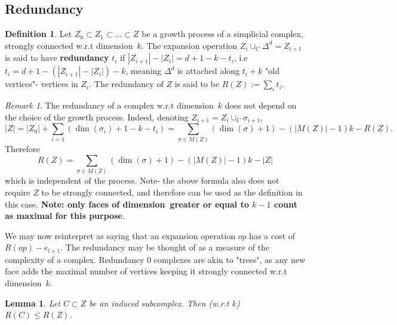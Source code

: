 \documentclass{article}
\newcommand{\prs}[1]{\left( #1 \right)}
\theoremstyle{plain}
\newtheorem{lemma}[theorem]{Lemma}
\theoremstyle{definition}
\newtheorem{definition}[theorem]{Definition}
\theoremstyle{remark}
\newtheorem{remark}[theorem]{Remark}
\newcommand{\di}{dimension}
\begin{document}
\subsection{Redundancy}
\begin{definition}\label{def:redun}
    Let $Z_0\subset Z_1\subset...\subset Z$ be a growth process of a simplicial complex, strongly connected w.r.t \di \ $k$. The expansion operation $Z_i\cup _{C}\Delta^d= Z_{i+1}$ is said to have \textbf{redundancy} $t_i$ if $|Z_{i+1}|-|Z_i|=d+1-k-t_i$, i.e $t_i=d+1-(|Z_{i+1}|-|Z_i|)-k$, meaning $\Delta^d$ is attached along $t_i+k$ "old vertices"- vertices in $Z_i$. 
    The redundancy of $Z$ is said to be $R(Z):=\sum_i t_i$.
\end{definition}
\begin{remark}
    The redundancy of a complex w.r.t \di \ $k$ does not depend on the choice of the growth process. Indeed, denoting $ Z_{i+1}=Z_i\cup _{C}\sigma_{i+1}$, 
    $$|Z|=|Z_0|+\sum_{i=1}\prs{\dim(\sigma_{i})+1-k-t_i}=\sum_{\sigma\in M(Z)}(\dim(\sigma)+1)-(|M(Z)|-1)k-R(Z).$$
    Therefore
    \begin{equation}\label{eqDefRedun}
        R(Z)=\sum_{\sigma\in M(Z)}(\dim(\sigma)+1)-(|M(Z)|-1)k-|Z|
    \end{equation}
    which is independent of the process. Note- the above formula also does not require $Z$ to be strongly connected, and therefore can be used as the definition in this case. \textbf{Note: only faces of \di \ greater or equal to $k-1$ count as maximal for this purpose}. \par
    We may now reinterpret  as saying that an expansion operation $op$ has a cost of $R(op)-e_{l+1}$.
    The redundancy may be thought of as a measure of the complexity of a complex.
    Redundancy $0$ complexes are akin to "trees", as any new face adds the maximal number of vertices keeping it strongly connected w.r.t \di \ $k$.
\end{remark}
\begin{lemma}\label{lem:redunMonotonic}
    Let $C\subset Z$ be an induced subcomplex. Then (w.r.t $k$) $R(C)\le R(Z)$.
\end{lemma}
\end{document}
